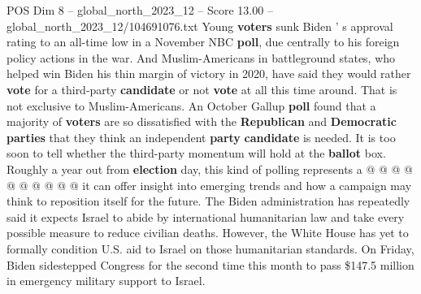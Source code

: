 \begin{textsample}{POS Dim 8 – global\_north\_2023\_12 – Score 13.00 – global\_north\_2023\_12/104691076.txt}
Young \textbf{voters} sunk Biden ' s approval rating to an all-time low in a November NBC \textbf{poll}, due centrally to his foreign policy actions in the war.
And Muslim-Americans in battleground states, who helped win Biden his thin margin of victory in 2020, have said they would rather \textbf{vote} for a third-party \textbf{candidate} or not \textbf{vote} at all this time around.
That is not exclusive to Muslim-Americans.
An October Gallup \textbf{poll} found that a majority of \textbf{voters} are so dissatisfied with the \textbf{Republican} and \textbf{Democratic} \textbf{parties} that they think an independent \textbf{party} \textbf{candidate} is needed.
It is too soon to tell whether the third-party momentum will hold at the \textbf{ballot} box.
Roughly a year out from \textbf{election} day, this kind of polling represents a @ @ @ @ @ @ @ @ @ @ it can offer insight into emerging trends and how a campaign may think to reposition itself for the future.
The Biden administration has repeatedly said it expects Israel to abide by international humanitarian law and take every possible measure to reduce civilian deaths.
However, the White House has yet to formally condition U.S. aid to Israel on those humanitarian standards.
On Friday, Biden sidestepped Congress for the second time this month to pass \$147.5 million in emergency military support to Israel.

\end{textsample}
